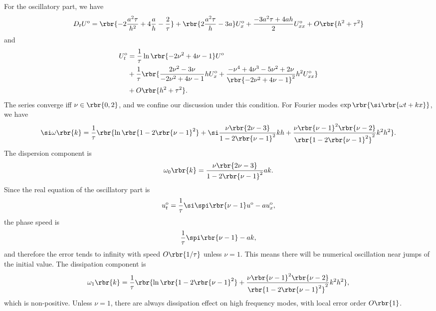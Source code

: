 \documentclass[english, nochinese]{pnote}
\begin{document}
For the oscillatory part, we have
\begin{equation}
D_t U^{\text{o}}  = \rbr{ -2 \frac{ a^2 \tau }{h^2} + 4 \frac{a}{h} - \frac{2}{\tau} } + \rbr{ 2 \frac{ a^2 \tau }{h} - 3 a } U^{\text{o}} _x + \frac{ -3 a^2 \tau + 4 a h }{2} U^{\text{o}} _{ x x } + O \rbr{ h^2 + \tau^2 }
\end{equation}
and
\begin{equation}
\begin{split}
U^{\text{o}} _t &= \frac{1}{\tau} \ln \rbr{ -2 \nu^2 + 4 \nu - 1 } U^{\text{o}}  \\
&+ \frac{1}{\tau} \rbr{ \frac{ 2 \nu^2 - 3 \nu }{ -2 \nu^2 + 4 \nu - 1 } h U^{\text{o}} _x + \frac{ -\nu^4 + 4 \nu^3 - 5 \nu^2 + 2 \nu }{\rbr{-2 \nu^2 + 4 \nu - 1}^2} h^2 U^{\text{o}} _{ x x } } \\
&+ O \rbr{ h^2 + \tau^2 }.
\end{split}
\end{equation}
The series converge iff $ \nu \in \rbr{ 0, 2 } $, and we confine our discussion under this condition. For Fourier modes $ \exp \rbr{ \si \rbr{ \omega t + k x  } } $, we have
\begin{equation}
\si \omega \rbr{k} = \frac{1}{\tau} \rbr{ \ln \rbr{ 1 - 2 \rbr{ \nu - 1 }^2 } + \si \frac{ \nu \rbr{ 2 \nu - 3 } }{ 1 - 2 \rbr{ \nu - 1 }^2 } k h + \frac{ \nu \rbr{ \nu - 1 }^2 \rbr{ \nu - 2 } }{\rbr{ 1 - 2 \rbr{ \nu - 1 }^2 }^2} k^2 h ^2 }.
\end{equation}
The dispersion component is
\begin{equation}
\omega_0 \rbr{k} = \frac{ \nu \rbr{ 2 \nu - 3 } }{ 1 - 2 \rbr{ \nu - 1 }^2 } a k.
\end{equation}
Since the real equation of the oscillatory part is
\begin{equation}
u^{\text{o}}_t = \frac{1}{\tau} \si \spi \rbr{ \nu - 1 } u^{\text{o}} - a u^{\text{o}}_x,
\end{equation}
the phase speed is
\begin{equation}
\frac{1}{\tau} \spi \rbr{ \nu - 1 } - a k,
\end{equation}
and therefore the error tends to infinity with speed $ O \rbr{ 1 / \tau } $ unless $ \nu = 1 $. This means there will be numerical oscillation near jumps of the initial value. The dissipation component is
\begin{equation}
\omega_1 \rbr{k} = \frac{1}{\tau} \rbr{ \ln \rbr{ 1 - 2 \rbr{ \nu - 1 }^2 } + \frac{ \nu \rbr{ \nu - 1 }^2 \rbr{ \nu - 2 } }{\rbr{ 1 - 2 \rbr{ \nu - 1 }^2 }^2} k^2 h ^2 },
\end{equation}
which is non-positive. Unless $ \nu = 1 $, there are always dissipation effect on high frequency modes, with local error order $ O \rbr{1} $.
\end{document}
